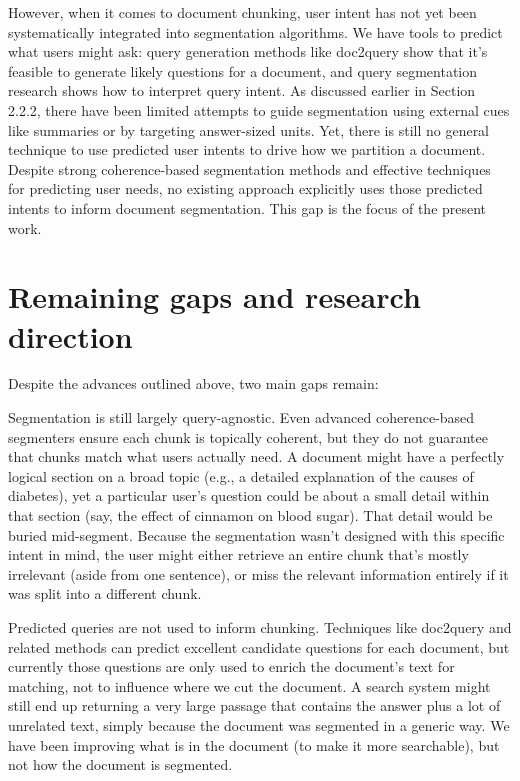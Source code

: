 \documentclass[12pt,a4paper]{report}
\begin{document}
However, when it comes to document chunking, user intent has not yet been systematically integrated into segmentation algorithms. We have tools to predict what users might ask: query generation methods like doc2query show that it's feasible to generate likely questions for a document, and query segmentation research shows how to interpret query intent. As discussed earlier in Section 2.2.2, there have been limited attempts to guide segmentation using external cues like summaries or by targeting answer-sized units. Yet, there is still no general technique to use predicted user intents to drive how we partition a document. Despite strong coherence-based segmentation methods and effective techniques for predicting user needs, no existing approach explicitly uses those predicted intents to inform document segmentation. This gap is the focus of the present work.

\section{Remaining gaps and research direction}

Despite the advances outlined above, two main gaps remain:

Segmentation is still largely query-agnostic. Even advanced coherence-based segmenters ensure each chunk is topically coherent, but they do not guarantee that chunks match what users actually need. A document might have a perfectly logical section on a broad topic (e.g., a detailed explanation of the causes of diabetes), yet a particular user's question could be about a small detail within that section (say, the effect of cinnamon on blood sugar). That detail would be buried mid-segment. Because the segmentation wasn't designed with this specific intent in mind, the user might either retrieve an entire chunk that's mostly irrelevant (aside from one sentence), or miss the relevant information entirely if it was split into a different chunk.

Predicted queries are not used to inform chunking. Techniques like doc2query and related methods can predict excellent candidate questions for each document, but currently those questions are only used to enrich the document's text for matching, not to influence where we cut the document. A search system might still end up returning a very large passage that contains the answer plus a lot of unrelated text, simply because the document was segmented in a generic way. We have been improving what is in the document (to make it more searchable), but not how the document is segmented.
\end{document}
